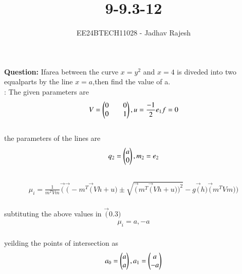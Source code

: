 \documentclass[journal]{IEEEtran}
\begin{document}

\vspace{3cm}
\title{9-9.3-12}
\author{EE24BTECH11028 - Jadhav Rajesh}
{\let\newpage\relax\maketitle}

\renewcommand{\thefigure}{\theenumi}
\renewcommand{\thetable}{\theenumi}
\setlength{\intextsep}{10pt} %


\renewcommand{\thetable}{\theenumi}
 \textbf{Question:} Ifarea between the curve $x=y^{2}$ and $x=4$ is diveded into two equalparts by the line $x=a$,then find the value of a.\\
 \solution : The given parameters are
 \begin{align}
               V=\begin{pmatrix}0 && 0\\
                        0 && 1\end{pmatrix},u=\frac{-1}{2}e_{1}f=0
  \end{align}\\
  the parameters of the lines are\\
  \begin{align}
                   q_{2}=\begin{pmatrix}
                                 a\\
                                 0
                   \end{pmatrix},m_{2}=e_{2}
  \end{align}\\
  \begin{align}
                \mu_{i}=\frac{1}{m^{T}Vm}\vec(\vec(-m^{T}\vec(Vh+u)\pm\sqrt{\vec(m^{T}\vec(Vh+u))^{2}}-g\vec(h)\vec(m^{T}Vm))
  \end{align}\\
  subtituting the above values in $\vec(0.3)$
  \begin{align}
                \mu_{i}=a,-a
  \end{align}\\
  yeilding the points of intersection as\\
  \begin{align}
                  a_{0}=\begin{pmatrix}
                               a\\
                               a\end{pmatrix},a_{1}=\begin{pmatrix}
                                                a\\
                                                -a\end{pmatrix}
  \end{align}\\
\end{document}
